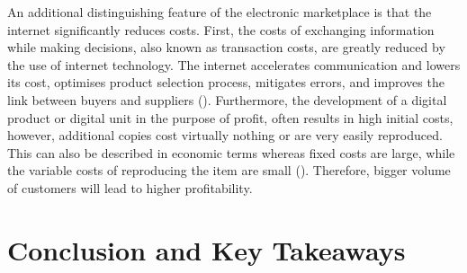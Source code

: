 \documentclass[11pt,a4paper]{article}
\begin{document}
{{{An additional distinguishing feature of the electronic marketplace is that the internet significantly reduces costs. First, the costs of exchanging information while making decisions, also known as transaction costs, are greatly reduced by the use of internet technology. The internet accelerates communication and lowers its cost, optimises product selection process, mitigates errors, and improves the link between buyers and suppliers (\cite{bunduchiBusinessRelationshipsInternetbased2005}). Furthermore, the development of a digital product or digital unit in the purpose of profit, often results in high initial costs, however, additional copies cost virtually nothing or are very easily reproduced. This can also be described in economic terms whereas fixed costs are large, while the variable costs of reproducing the item are small (\cite{shapiroInformationRulesStrategic1998a}). Therefore, bigger volume of customers will lead to higher profitability.


	
\newpage

\section{Conclusion and Key Takeaways}
\label{conclusion}


\newpage

 
\pagebreak


\nocite{mccarthyAmericansTrustTech}
\printbibliography





}}}
\end{document}
